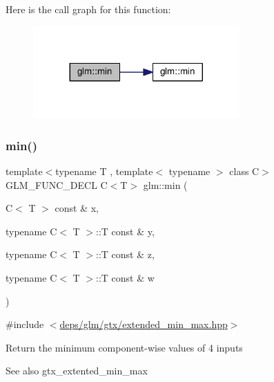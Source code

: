 Here is the call graph for this function\+:
\nopagebreak
\begin{figure}[H]
\begin{center}
\leavevmode
\includegraphics[width=224pt]{df/d72/group__gtx__extended__min__max_ga95466987024d03039607f09e69813d69_cgraph}
\end{center}
\end{figure}
\mbox{\label{group__gtx__extended__min__max_ga4fe35dd31dd0c45693c9b60b830b8d47}} 
\subsubsection{\texorpdfstring{min()}{min()}\hspace{0.1cm}{\footnotesize\ttfamily [5/6]}}
{\footnotesize\ttfamily template$<$typename T , template$<$ typename $>$ class C$>$ \\
G\+L\+M\+\_\+\+F\+U\+N\+C\+\_\+\+D\+E\+CL C$<$T$>$ glm\+::min (\begin{DoxyParamCaption}\item[{C$<$ T $>$ const \&}]{x,  }\item[{typename C$<$ T $>$\+::T const \&}]{y,  }\item[{typename C$<$ T $>$\+::T const \&}]{z,  }\item[{typename C$<$ T $>$\+::T const \&}]{w }\end{DoxyParamCaption})}



{\ttfamily \#include $<$\hyperlink{extended__min__max_8hpp}{deps/glm/gtx/extended\+\_\+min\+\_\+max.\+hpp}$>$}

Return the minimum component-\/wise values of 4 inputs \begin{DoxySeeAlso}{See also}
gtx\+\_\+extented\+\_\+min\+\_\+max 
\end{DoxySeeAlso}


